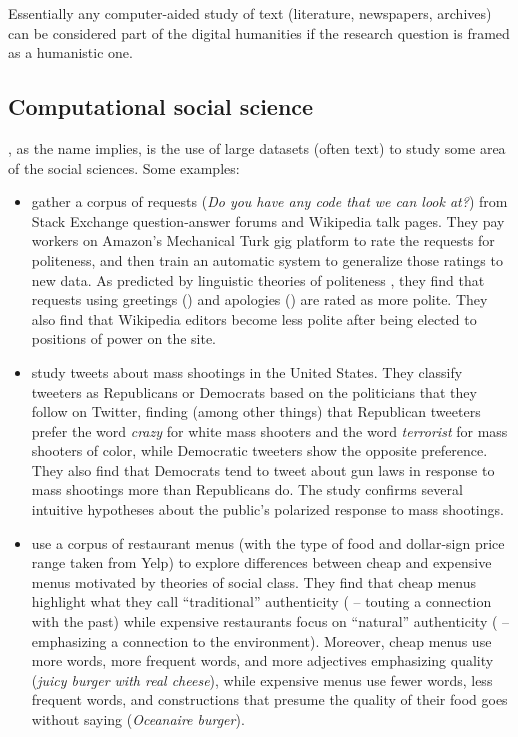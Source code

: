 Essentially any computer-aided study of text (literature, newspapers,
archives) can be considered part of the digital humanities if the
research question is framed as a humanistic one.



\subsection{Computational social science}


, as the name implies, is the use of large datasets (often
text) to study some area of the social sciences.  Some examples:

\begin{itemize}

\item \citet{Danescu-etal:2013} gather a corpus of requests
(\textit{Do you have any code that we can look at?}) from Stack
Exchange question-answer forums and Wikipedia talk pages.  They pay
workers on Amazon's Mechanical Turk gig platform to rate the requests for
politeness, and then train an automatic system to generalize those
ratings to new data.  As predicted by linguistic theories of politeness \citep{BrownLevinson:1987}, they find that requests using greetings () and apologies () are rated as more polite. They also find that Wikipedia editors become less
polite after being elected to positions of power on the site.

\item \citet{Demszky-etal:2019} study tweets about mass shootings in
the United States.  They classify tweeters as Republicans or Democrats
based on the politicians that they follow on Twitter, finding (among
other things) that Republican tweeters prefer the word \textit{crazy}
for white mass shooters and the word \textit{terrorist} for mass
shooters of color, while Democratic tweeters show the opposite
preference.  They also find that Democrats tend to tweet about gun
laws in response to mass shootings more than Republicans do.  The
study confirms several intuitive hypotheses about the public's
polarized response to mass shootings.

\item \citet{Jurafsky-etal:2018} use a corpus of restaurant menus
(with the type of food and dollar-sign price range taken from Yelp) to
explore differences between cheap and expensive menus motivated by
theories of social class.  They find that cheap menus highlight what
they call ``traditional'' authenticity ( --
touting a connection with the past) while expensive restaurants focus
on ``natural'' authenticity ( --
emphasizing a connection to the environment).  Moreover, cheap menus
use more words, more frequent words, and more adjectives emphasizing
quality (\textit{juicy burger with real cheese}), while expensive
menus use fewer words, less frequent words, and constructions that
presume the quality of their food goes without saying
(\textit{Oceanaire burger}).

\end{itemize}

